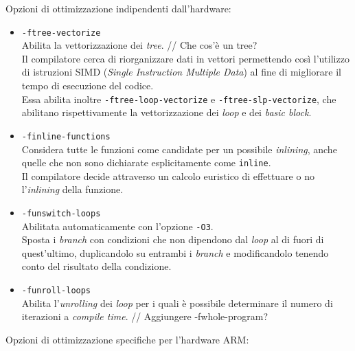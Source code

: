 Opzioni di ottimizzazione indipendenti dall'hardware:

\begin{itemize}
\item \verb|-ftree-vectorize|\\
Abilita la vettorizzazione dei \emph{tree}.
// Che cos'è un tree?\\
Il compilatore cerca di riorganizzare dati in vettori permettendo così 
l'utilizzo di istruzioni SIMD (\emph{Single Instruction Multiple Data}) al fine 
di migliorare il tempo di esecuzione del codice.\\
Essa abilita inoltre \verb|-ftree-loop-vectorize| e 
\verb|-ftree-slp-vectorize|, che abilitano rispettivamente la vettorizzazione 
dei \emph{loop} e dei \emph{basic block}.
\item \verb|-finline-functions|\\
Considera tutte le funzioni come candidate per un possibile \emph{inlining}, 
anche quelle che non sono dichiarate esplicitamente come \verb|inline|.\\
Il compilatore decide attraverso un calcolo euristico di effettuare o no 
l'\emph{inlining} della funzione. 
\item \verb|-funswitch-loops|\\
Abilitata automaticamente con l'opzione \verb|-O3|.\\
Sposta i \emph{branch} con condizioni che non dipendono dal \emph{loop} al di 
fuori di quest'ultimo, duplicandolo su entrambi i \emph{branch} e modificandolo 
tenendo conto del risultato della condizione.
\item \verb|-funroll-loops|\\
Abilita l'\emph{unrolling} dei \emph{loop} per i quali è possibile determinare 
il numero di iterazioni a \emph{compile time}.
// Aggiungere -fwhole-program?
\end{itemize}

Opzioni di ottimizzazione specifiche per l'hardware ARM:


